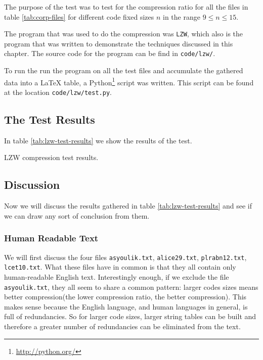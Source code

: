 The purpose of the test was to test for the compression ratio for all
the files in table \ref{tab:corp-files} for different code fixed sizes
$n$ in the range $9 \leq n \leq 15$.

The program that was used to do the compression was \verb|LZW|, which
also is the program that was written to demonstrate the techniques
discussed in this chapter. The source code for the program can be find
in \verb|code/lzw/|.

To run the run the program on all the test files and accumulate the
gathered data into a \LaTeX{} table, a Python\footnote{\url{http://python.org/}} script was written. This
script can be found at the location \verb|code/lzw/test.py|.

\subsection{The Test Results}

In table \ref{tab:lzw-test-results} we show the results of the test.

\begin{table}
  \scriptsize
  \centering
  
  \caption{LZW compression test results.}
  \label{tab:lzw-test-results}
\end{table}

\subsection{Discussion}

Now we will discuss the results gathered in table
\ref{tab:lzw-test-results} and see if we can draw any sort of
conclusion from them.

\subsubsection{Human Readable Text}

We will first discuss the four files \verb|asyoulik.txt|,
\verb|alice29.txt|, \verb|plrabn12.txt|, \verb|lcet10.txt|. What these
files have in common is that they all contain only human-readable
English text. Interestingly enough, if we exclude the file
\verb|asyoulik.txt|, they all seem to share a common pattern: larger
codes sizes means better compression(the lower compression ratio, the
better compression). This makes sense because the English language,
and human languages in general, is full of redundancies. So for larger
code sizes, larger string tables can be built and therefore a greater
number of redundancies can be eliminated from the text.

